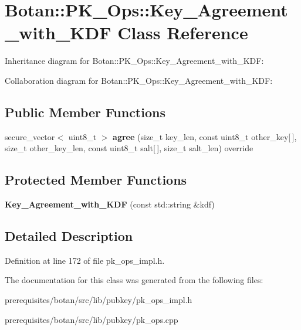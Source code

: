\hypertarget{class_botan_1_1_p_k___ops_1_1_key___agreement__with___k_d_f}{}\section{Botan\+:\+:P\+K\+\_\+\+Ops\+:\+:Key\+\_\+\+Agreement\+\_\+with\+\_\+\+K\+DF Class Reference}
\label{class_botan_1_1_p_k___ops_1_1_key___agreement__with___k_d_f}


Inheritance diagram for Botan\+:\+:P\+K\+\_\+\+Ops\+:\+:Key\+\_\+\+Agreement\+\_\+with\+\_\+\+K\+DF\+:


Collaboration diagram for Botan\+:\+:P\+K\+\_\+\+Ops\+:\+:Key\+\_\+\+Agreement\+\_\+with\+\_\+\+K\+DF\+:
\subsection*{Public Member Functions}
\begin{DoxyCompactItemize}
\item 
\mbox{\label{class_botan_1_1_p_k___ops_1_1_key___agreement__with___k_d_f_affdd284f0d224a8b0c3945464f790567}} 
secure\+\_\+vector$<$ uint8\+\_\+t $>$ {\bfseries agree} (size\+\_\+t key\+\_\+len, const uint8\+\_\+t other\+\_\+key\mbox{[}$\,$\mbox{]}, size\+\_\+t other\+\_\+key\+\_\+len, const uint8\+\_\+t salt\mbox{[}$\,$\mbox{]}, size\+\_\+t salt\+\_\+len) override
\end{DoxyCompactItemize}
\subsection*{Protected Member Functions}
\begin{DoxyCompactItemize}
\item 
\mbox{\label{class_botan_1_1_p_k___ops_1_1_key___agreement__with___k_d_f_afbfc11438af0f78136fe75d6a90f2794}} 
{\bfseries Key\+\_\+\+Agreement\+\_\+with\+\_\+\+K\+DF} (const std\+::string \&kdf)
\end{DoxyCompactItemize}


\subsection{Detailed Description}


Definition at line 172 of file pk\+\_\+ops\+\_\+impl.\+h.



The documentation for this class was generated from the following files\+:\begin{DoxyCompactItemize}
\item 
prerequisites/botan/src/lib/pubkey/pk\+\_\+ops\+\_\+impl.\+h\item 
prerequisites/botan/src/lib/pubkey/pk\+\_\+ops.\+cpp\end{DoxyCompactItemize}
